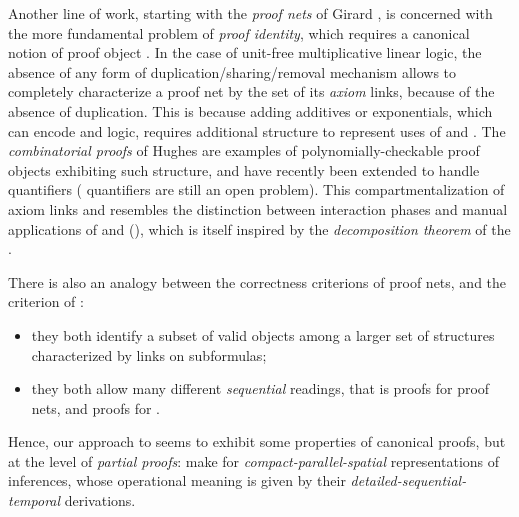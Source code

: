 \begin{scope}
Another line of work, starting with the \emph{proof nets} of Girard
, is concerned with the more fundamental problem of
\emph{proof identity}, which requires a canonical notion of proof object
. In the case of unit-free multiplicative
linear logic, the absence of any form of duplication/sharing/removal mechanism
allows to completely characterize a proof net by the set of its \emph{axiom}
links,
because of the absence of duplication. This is because adding additives or
exponentials, which can encode  and  logic, requires
additional structure to represent uses of  and . The
\emph{combinatorial proofs} of Hughes
 are examples of
polynomially-checkable proof objects exhibiting such structure, and have
recently been extended to handle   quantifiers
 ( quantifiers are still an open
problem). This compartmentalization of axiom links and 
resembles the distinction between interaction phases and manual applications of
{} and {} (), which is itself inspired by
the \emph{decomposition theorem} of the 
.

There is also an analogy between the correctness criterions of proof nets, and
the  criterion of :
\begin{itemize}
  \item they both identify a subset of valid objects among a larger set of
  structures characterized by links on subformulas;
  \item they both allow many different \emph{sequential} readings, that is
   proofs for proof nets, and  proofs for
  .
\end{itemize}
Hence, our approach to  seems to exhibit some properties of
canonical proofs, but at the level of \emph{partial proofs}:   make
for \emph{compact-parallel-spatial} representations of inferences, whose
operational meaning is given by their \emph{detailed-sequential-temporal} 
derivations.



\end{scope}
